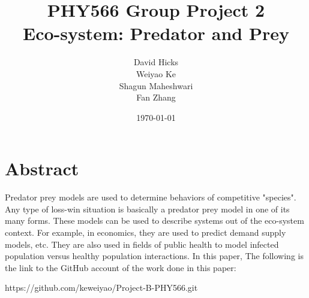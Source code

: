 \documentclass[a4paper,12pt]{article}
\begin{document}
\title{PHY566 Group Project 2 \\ 
	Eco-system: Predator and Prey}
\date{\today}
\author{David Hicks\\ Weiyao Ke \\ Shagun Maheshwari \\ Fan Zhang}

\maketitle
\section{Abstract}
Predator prey models are used to determine behaviors of competitive "species". Any type of loss-win situation is basically a predator prey model in one of its many forms.
These models can be used to describe systems out of the eco-system context. For example, in economics, they are used to predict demand supply models, etc. They are also used in fields of public health to model infected population versus healthy population interactions.
In this paper, 
The following is the link to the GitHub account of the work done in this paper: \\
\begin{center}
https://github.com/keweiyao/Project-B-PHY566.git
\end{center}
\end{document}
